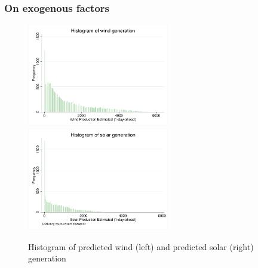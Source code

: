 \subsubsection{On exogenous factors}
\label{statdesEXO}
\begin{figure}[H]
\begin{center}
\includegraphics[trim=0cm 0cm 0cm 0cm, clip=true, height=45mm]{figch2/m1b.pdf} 
\hspace{0.05cm}
\includegraphics[trim=0cm 0cm 0cm 0cm, clip=true, height=45mm]{figch2/m2b.pdf} 
\caption{Histogram of predicted wind (left) and predicted solar (right) generation}
\label{m1b}
\end{center}
\end{figure}



%
%

















